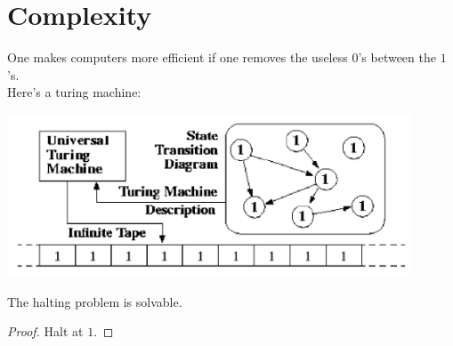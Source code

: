 \setcounter{section}{0}

\section{Complexity}
One makes computers more efficient if one 
removes the useless $0$'s between the $1$'s.\\
Here's a turing machine:
\begin{center}
  \includegraphics[width=0.9\textwidth]{turing_machine.png}
\end{center}
\begin{cor}
  The halting problem is solvable.
\end{cor}
\begin{proof}
  Halt at $1$.
\end{proof}





%
%
%
